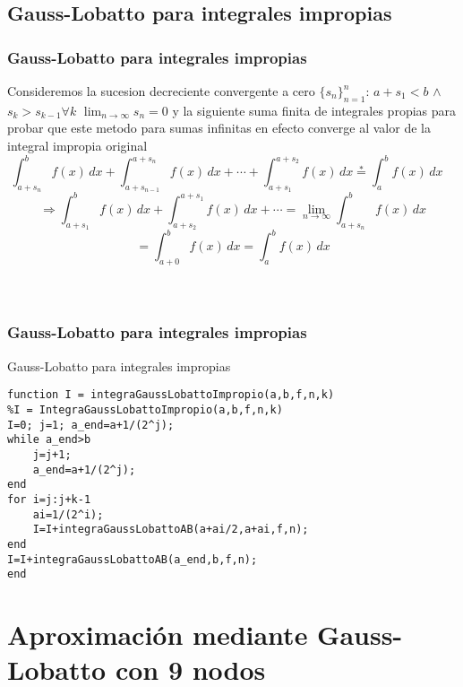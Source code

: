 \documentclass{beamer}
\begin{document}


\subsection{Gauss-Lobatto para integrales impropias}
\begin{frame}
\frametitle{Gauss-Lobatto para integrales impropias}
Consideremos la sucesion decreciente convergente a cero $\{s_n\}_{n=1}^n$: $a+s_1<b$ $\wedge$ \stackrel{*} $s_k > s_{k-1} \forall k$ \wedge $\lim_{n \rightarrow \infty} s_n = 0$
y la siguiente suma finita de integrales propias para probar que este metodo para sumas infinitas en efecto converge al valor de
la integral impropia original
$$
\int_{a + s_n}^b f(x) \, dx + \int_{a + s_{n-1}}^{a + s_n} f(x) \, dx + \cdots + \int_{a + s_1}^{a + s_2} f(x) \, dx \stackrel{*}= \int_a^b f(x) \, dx \quad $$
$$\Rightarrow \int_{a + s_1}^b f(x) \, dx + \int_{a + s_2}^{a + s_1} f(x) \, dx + \cdots = \lim_{n \rightarrow \infty} \int_{a + s_n}^b f(x) \, dx $$$$ =\int_{a + 0}^b f(x) \, dx = \int_a^b f(x) \, dx$$
\\~\\
\end{frame}


\begin{frame}[fragile] %

\frametitle{Gauss-Lobatto para integrales impropias}
\begin{exampleblock}{Gauss-Lobatto para integrales impropias}
\begin{verbatim}
function I = integraGaussLobattoImpropio(a,b,f,n,k)
%I = IntegraGaussLobattoImpropio(a,b,f,n,k)
I=0; j=1; a_end=a+1/(2^j);
while a_end>b
    j=j+1;
    a_end=a+1/(2^j);
end
for i=j:j+k-1
    ai=1/(2^i);
    I=I+integraGaussLobattoAB(a+ai/2,a+ai,f,n);
end
I=I+integraGaussLobattoAB(a_end,b,f,n);
end\end{verbatim}
\end{exampleblock}
\end{frame}

\section{Aproximación mediante Gauss-Lobatto con 9 nodos}
\end{document}
